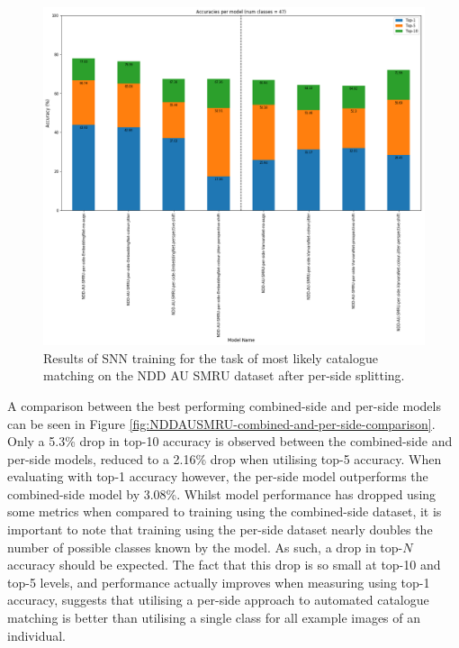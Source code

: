 \begin{figure}[t]
	\begin{center}
		\includegraphics[scale=0.4]{Chapter5/figs/NDDAUSMRU-per-side-SNN-model-accuracies.png}
	\end{center}
	\caption{Results of SNN training for the task of most likely catalogue matching on the NDD AU SMRU dataset after per-side splitting.}
	\label{fig:NDDAUSMRU-per-side-SNN-model-accuracies}
\end{figure}

 A comparison between the best performing combined-side and per-side models can be seen in Figure \ref{fig:NDDAUSMRU-combined-and-per-side-comparison}. Only a 5.3\% drop in top-10 accuracy is observed between the combined-side and per-side models, reduced to a 2.16\% drop when utilising top-5 accuracy. When evaluating with top-1 accuracy however, the per-side model outperforms the combined-side model by 3.08\%. Whilst model performance has dropped using some metrics when compared to training using the combined-side dataset, it is important to note that training using the per-side dataset nearly doubles the number of possible classes known by the model. As such, a drop in top-$N$ accuracy should be expected. The fact that this drop is so small at top-10 and top-5 levels, and performance actually improves when measuring using top-1 accuracy, suggests that utilising a per-side approach to automated catalogue matching is better than utilising a single class for all example images of an individual.

